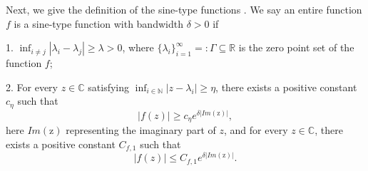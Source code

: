 \documentclass[a4paper]{article}
\numberwithin{equation}{section}
\begin{document}
 

Next, we give the definition of the sine-type functions \cite{levin1996lectures}. We say an entire function $f$ is a sine-type function with bandwidth $\delta>0$ if 

1. $\inf_{i\neq j }|\lambda_{i}-\lambda_{j}|\ge\lambda>0$, where $\{\lambda_{i}\}_{i=1}^{\infty}=:\Gamma\subseteq \mathbb{R}$ is the zero point set of the function $f$;

2. For every $ z\in\mathbb{C}$ satisfying $ \inf_{i\in \mathbb{N} }|z-\lambda_{i}|\ge \eta$, there exists a positive constant $c_{\eta}$  such that $$|f(z)|\ge c_{\eta}e^{\delta|Im(\mathrm z)|} ,$$ here $Im(\mathrm z)$ representing the imaginary part of $z$, and for every $z\in\mathbb{C}$, there exists  a positive constant  $C_{f,1}$ such that $$|f(z)|\le C_{f,1}e^{\delta|Im(\mathrm z)|} .$$
\end{document}
